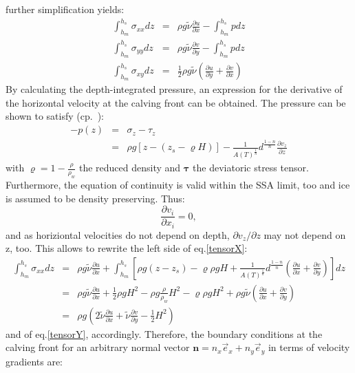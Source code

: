 \documentclass[a4paper,10pt]{article}
\begin{document}
further simplification yields:
\begin{eqnarray}%
\int_{h_m}^{h_s}\sigma_{xx}dz & = &
\rho g\tilde{\nu} \frac{\partial u}{\partial x} - \int_{h_m}^{h_s}p dz \label{tensorX}\\
\int_{h_m}^{h_s}\sigma_{yy}dz & = &
\rho g\tilde{\nu} \frac{\partial v}{\partial y} - \int_{h_m}^{h_s}p dz \label{tensorY}\\
\int_{h_m}^{h_s}\sigma_{xy}dz & = &
\frac{1}{2} \rho g\tilde{\nu} \left(\frac{\partial u}{\partial y}+\frac{\partial v}{\partial x} \right) \label{tensorXY}
\end{eqnarray}
By calculating the depth-integrated pressure, an expression for the derivative of the horizontal velocity at the calving front can be obtained. The pressure can be shown to satisfy (cp.~\cite{Weis01}):
\begin{eqnarray*}
-p(z) & = & \sigma_z - \tau_z \\
      & = & \rho g\left[z-\left(z_s-\varrho H\right)\right] -\frac{1}{A(T)^\frac{1}{n}}d^\frac{1-n}{n}\frac{\partial v_z}{\partial z}
\end{eqnarray*}
with $\varrho=1-\frac{\rho}{\rho_w}$ the reduced density and $\mathbf{\tau}$ the deviatoric stress tensor.  Furthermore, the equation of continuity is valid within the SSA limit, too and ice is assumed to be density preserving. Thus:
\begin{equation*}
\frac{\partial v_i}{\partial x_i} = 0,
\end{equation*}
and as horiziontal velocities do not depend on depth, $\partial v_z/ \partial
z$ may not depend on z, too. This allows to rewrite the left side of eq.\eqref{tensorX}:
\begin{eqnarray*}
\int_{h_m}^{h_s}\sigma_{xx}dz & = & \rho g\tilde{\nu} \frac{\partial u}{\partial x} + \int_{h_m}^{h_s} \left[ \rho g(z-z_s) - \varrho\rho gH+\frac{1}{A(T)^\frac{1}{n}}d^\frac{1-n}{n} \left( \frac{\partial u}{\partial x}+\frac{\partial v}{\partial y} \right) \right] dz \\
& = & \rho g\tilde{\nu} \frac{\partial u}{\partial x} +  \frac{1}{2}\rho gH^2 - \rho g \frac{\rho}{\rho_w}H^2 -\varrho\rho gH^2+\rho g \tilde{\nu}\left( \frac{\partial u}{\partial x} + \frac{\partial v}{\partial y} \right) \\
& = & \rho g \left(2\tilde{\nu}\frac{\partial u}{\partial x} + \tilde{\nu}\frac{\partial v}{\partial y} - \frac{1}{2}H^2   \right) 
\end{eqnarray*}
and of eq.\eqref{tensorY}, accordingly. Therefore, the boundary conditions at the calving front for an arbitrary normal vector $\mathbf{n}=n_x\overrightarrow{e}_x+n_y\overrightarrow{e}_y$ in terms of velocity gradients are: 
\end{document}
